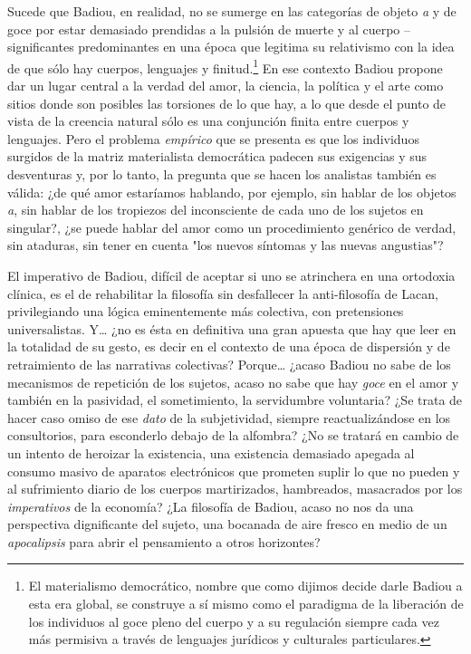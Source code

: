\documentclass{book}
\begin{document}
Sucede que Badiou, en realidad, no se sumerge en las categorías de
objeto \emph{a} y de goce por estar demasiado prendidas a la pulsión de
muerte y al cuerpo --significantes predominantes en una época que
legitima su relativismo con la idea de que sólo hay cuerpos, lenguajes y
finitud.\footnote{El materialismo democrático, nombre que como dijimos
  decide darle Badiou a esta era global, se construye a sí mismo como el
  paradigma de la liberación de los individuos al goce pleno del cuerpo
  y a su regulación siempre cada vez más permisiva a través de lenguajes
  jurídicos y culturales particulares.} En ese contexto Badiou propone
dar un lugar central a la verdad del amor, la ciencia, la política y el
arte como sitios donde son posibles las torsiones de lo que hay, a lo
que desde el punto de vista de la creencia natural sólo es una
conjunción finita entre cuerpos y lenguajes. Pero el problema
\emph{empírico} que se presenta es que los individuos surgidos de la
matriz materialista democrática padecen sus exigencias y sus desventuras
y, por lo tanto, la pregunta que se hacen los analistas también es
válida: ¿de qué amor estaríamos hablando, por ejemplo, sin hablar de los
objetos \emph{a}, sin hablar de los tropiezos del inconsciente de cada
uno de los sujetos en singular?, ¿se puede hablar del amor como un
procedimiento genérico de verdad, sin ataduras, sin tener en cuenta "los
nuevos síntomas y las nuevas angustias"?

El imperativo de Badiou, difícil de aceptar si uno se atrinchera en una
ortodoxia clínica, es el de rehabilitar la filosofía sin desfallecer la
anti-filosofía de Lacan, privilegiando una lógica eminentemente más
colectiva, con pretensiones universalistas. Y\ldots{} ¿no es ésta en
definitiva una gran apuesta que hay que leer en la totalidad de su
gesto, es decir en el contexto de una época de dispersión y de
retraimiento de las narrativas colectivas? Porque\ldots{} ¿acaso Badiou
no sabe de los mecanismos de repetición de los sujetos, acaso no sabe
que hay \emph{goce} en el amor y también en la pasividad, el
sometimiento, la servidumbre voluntaria? ¿Se trata de hacer caso omiso
de ese \emph{dato} de la subjetividad, siempre reactualizándose en los
consultorios, para esconderlo debajo de la alfombra? ¿No se tratará en
cambio de un intento de heroizar la existencia, una existencia demasiado
apegada al consumo masivo de aparatos electrónicos que prometen suplir
lo que no pueden y al sufrimiento diario de los cuerpos martirizados,
hambreados, masacrados por los \emph{imperativos} de la economía? ¿La
filosofía de Badiou, acaso no nos da una perspectiva dignificante del
sujeto, una bocanada de aire fresco en medio de un \emph{apocalipsis}
para abrir el pensamiento a otros horizontes?
\end{document}

